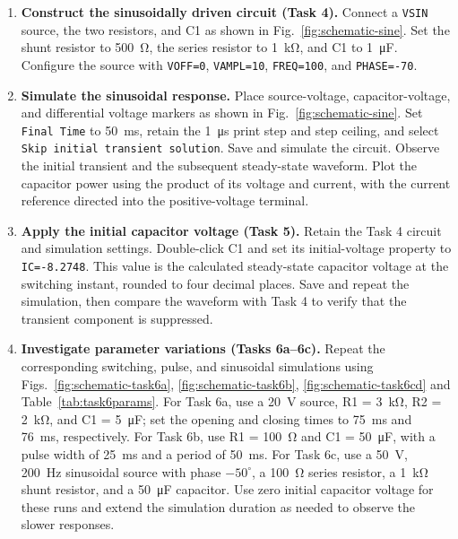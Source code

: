 \documentclass[12pt,a4paper]{article}
\begin{document}
\begin{enumerate}[label=\arabic*., leftmargin=2.5em, itemsep=6pt]
		\item \textbf{Construct the sinusoidally driven circuit (Task 4).}
		Connect a \texttt{VSIN} source, the two resistors, and C1 as
		shown in Fig.~\ref{fig:schematic-sine}.  Set the shunt
		resistor to \SI{500}{\ohm}, the series resistor to
		\SI{1}{\kilo\ohm}, and C1 to \SI{1}{\micro\farad}.
		Configure the source with \texttt{VOFF=0},
		\texttt{VAMPL=10}, \texttt{FREQ=100}, and
		\texttt{PHASE=-70}.
		
		\item \textbf{Simulate the sinusoidal response.}
		Place source-voltage, capacitor-voltage, and differential
		voltage markers as shown in Fig.~\ref{fig:schematic-sine}.
		Set \texttt{Final Time} to \SI{50}{\milli\second}, retain
		the \SI{1}{\micro\second} print step and step ceiling, and
		select \texttt{Skip initial transient solution}.
		Save and simulate the circuit.  Observe the initial transient
		and the subsequent steady-state waveform.  Plot the capacitor
		power using the product of its voltage and current, with the
		current reference directed into the positive-voltage terminal.
		
		\item \textbf{Apply the initial capacitor voltage (Task 5).}
		Retain the Task 4 circuit and simulation settings.
		Double-click C1 and set its initial-voltage property to
		\texttt{IC=-8.2748}.  This value is the calculated
		steady-state capacitor voltage at the switching instant,
		rounded to four decimal places.  Save and repeat the
		simulation, then compare the waveform with Task 4 to verify
		that the transient component is suppressed.
		
		\item \textbf{Investigate parameter variations (Tasks 6a--6c).}
		Repeat the corresponding switching, pulse, and sinusoidal
		simulations using
		Figs.~\ref{fig:schematic-task6a}, \ref{fig:schematic-task6b},
		\ref{fig:schematic-task6cd}
		and Table~\ref{tab:task6params}.  For Task 6a, use a
		\SI{20}{\volt} source, R1 = \SI{3}{\kilo\ohm},
		R2 = \SI{2}{\kilo\ohm}, and C1 = \SI{5}{\micro\farad};
		set the opening and closing times to \SI{75}{\milli\second}
		and \SI{76}{\milli\second}, respectively.
		For Task 6b, use R1 = \SI{100}{\ohm} and
		C1 = \SI{50}{\micro\farad}, with a pulse width of
		\SI{25}{\milli\second} and a period of
		\SI{50}{\milli\second}.  For Task 6c, use a
		\SI{50}{\volt}, \SI{200}{\hertz} sinusoidal source with
		phase $-50^\circ$, a \SI{100}{\ohm} series resistor,
		a \SI{1}{\kilo\ohm} shunt resistor, and a
		\SI{50}{\micro\farad} capacitor.  Use zero initial
		capacitor voltage for these runs and extend the simulation
		duration as needed to observe the slower responses.
		

\end{enumerate}
\end{document}
